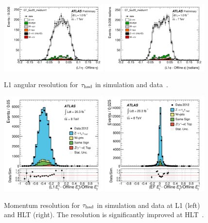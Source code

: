 \begin{figure}[tp]
  \centering
  \includegraphics[width=0.48\textwidth]{figures/ATL-COM-DAQ-2012-001/c_L1_etares}
  \includegraphics[width=0.48\textwidth]{figures/ATL-COM-DAQ-2012-001/c_L1_phires}
  \caption{L1 angular resolution for $\tau_\text{had}$ in simulation and data~\cite{ATL-COM-DAQ-2012-001}.}
  \label{fig:prospects-trigger-2011-angular}
\end{figure}

\begin{figure}[tp]
  \centering
  \includegraphics[width=0.48\textwidth]{figures/PERF-2013-06/fig_18a}
  \includegraphics[width=0.48\textwidth]{figures/PERF-2013-06/fig_18c}
  \caption{Momentum resolution for $\tau_\text{had}$ in simulation and data at L1 (left) and HLT (right). The resolution is significantly improved at HLT~\cite{PERF-2013-06}.}
  \label{fig:prospects-trigger-resolution}
\end{figure}

